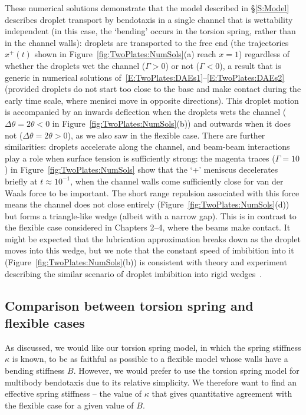 These numerical solutions demonstrate that the model described in \S\ref{S:Model} describes droplet transport by bendotaxis in a single channel that is wettability independent (in this case, the `bending' occurs in the torsion spring, rather than in the channel walls): droplets are transported to the free end (the trajectories $x^{+}(t)$ shown in Figure~\ref{fig:TwoPlates:NumSols}(a) reach $x = 1$) regardless of whether the droplets wet the channel ($\Gamma > 0$) or not ($\Gamma < 0$), a result that is generic in numerical solutions of~\eqref{E:TwoPlates:DAEs1}--\eqref{E:TwoPlates:DAEs2} (provided droplets do not start too close to the base and make contact during the early time scale, where menisci move in opposite directions). This droplet motion is accompanied by an inwards deflection when the droplets wets the channel ($\Delta \theta = 2\theta <0$ in Figure~\ref{fig:TwoPlates:NumSols}(b)) and outwards when it does not ($\Delta \theta = 2\theta >0$), as we also saw in the flexible case. There are further similarities: droplets accelerate along the channel, and beam-beam interactions play a role when surface tension is sufficiently strong: the magenta traces ($\Gamma = 10$) in Figure~\ref{fig:TwoPlates:NumSols} show that the `+' meniscus decelerates briefly at $t\approx 10^{-1}$, when the channel walls come sufficiently close for van der Waals force to be important. The short range repulsion associated with this force means the channel does not close entirely (Figure~\ref{fig:TwoPlates:NumSols}(d)) but forms a triangle-like wedge (albeit with a narrow gap). This is in contrast to the flexible case considered in Chapters 2--4, where the beams make contact. It might be expected that the lubrication approximation breaks down as the droplet moves into this wedge, but we note that the constant speed of imbibition into it (Figure~\ref{fig:TwoPlates:NumSols}(b)) is consistent with theory and experiment describing the similar scenario of droplet imbibition into rigid wedges~\citep{Reyssat2014JFM}.




\subsection{Comparison between torsion spring and flexible cases}\label{S:SingleChannel:FlexibleComparison}
As discussed, we would like our torsion spring model, in which the spring stiffness $\kappa$ is known, to be as faithful as possible to a flexible model whose walls have a bending stiffness $B$. However, we would prefer to use the torsion spring model for multibody bendotaxis due to its relative simplicity. We therefore want to find an effective spring stiffness -- the value of $\kappa$ that gives quantitative agreement with the flexible case for a given value of $B$.

